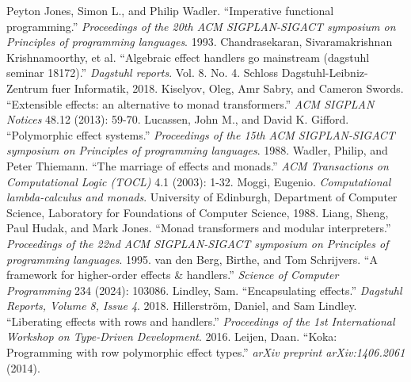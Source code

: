 \documentclass[conference]{IEEEtran}
\begin{document}
    \begin{thebibliography}{00}
         Peyton Jones, Simon L., and Philip Wadler. ``Imperative functional programming.'' \textit{Proceedings of the 20th ACM SIGPLAN-SIGACT symposium on Principles of programming languages}. 1993.
         Chandrasekaran, Sivaramakrishnan Krishnamoorthy, et al. ``Algebraic effect handlers go mainstream (dagstuhl seminar 18172).'' \textit{Dagstuhl reports}. Vol. 8. No. 4. Schloss Dagstuhl-Leibniz-Zentrum fuer Informatik, 2018.
         Kiselyov, Oleg, Amr Sabry, and Cameron Swords. ``Extensible effects: an alternative to monad transformers.'' \textit{ACM SIGPLAN Notices} 48.12 (2013): 59-70.
         Lucassen, John M., and David K. Gifford. ``Polymorphic effect systems.'' \textit{Proceedings of the 15th ACM SIGPLAN-SIGACT symposium on Principles of programming languages}. 1988.
         Wadler, Philip, and Peter Thiemann. ``The marriage of effects and monads.'' \textit{ACM Transactions on Computational Logic (TOCL)} 4.1 (2003): 1-32.
         Moggi, Eugenio. \textit{Computational lambda-calculus and monads}. University of Edinburgh, Department of Computer Science, Laboratory for Foundations of Computer Science, 1988.
         Liang, Sheng, Paul Hudak, and Mark Jones. ``Monad transformers and modular interpreters.'' \textit{Proceedings of the 22nd ACM SIGPLAN-SIGACT symposium on Principles of programming languages}. 1995.
         van den Berg, Birthe, and Tom Schrijvers. ``A framework for higher-order effects \& handlers.'' \textit{Science of Computer Programming} 234 (2024): 103086.
         Lindley, Sam. ``Encapsulating effects.'' \textit{Dagstuhl Reports, Volume 8, Issue 4}. 2018.
         Hillerström, Daniel, and Sam Lindley. ``Liberating effects with rows and handlers.'' \textit{Proceedings of the 1st International Workshop on Type-Driven Development}. 2016.
         Leijen, Daan. ``Koka: Programming with row polymorphic effect types.'' \textit{arXiv preprint arXiv:1406.2061} (2014).
    \end{thebibliography}
\end{document}
